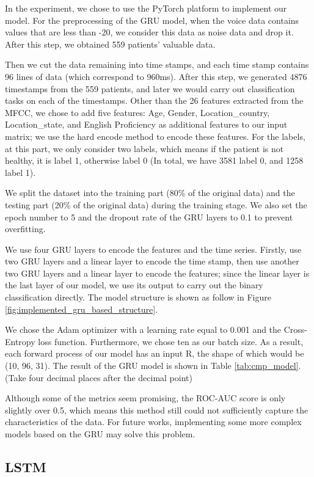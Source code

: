 \documentclass[11pt]{article}
\begin{document}
In the experiment, we chose to use the PyTorch platform to implement our model. For the preprocessing of the GRU model, when the voice data contains values that are less than -20, we consider this data as noise data and drop it. After this step, we obtained 559 patients’ valuable data.

Then we cut the data remaining into time stamps, and each time stamp contains 96 lines of data (which correspond to 960ms). After this step, we generated 4876 timestamps from the 559 patients, and later we would carry out classification tasks on each of the timestamps. Other than the 26 features extracted from the MFCC, we chose to add five features: Age, Gender, Location\_country, Location\_state, and English Proficiency as additional features to our input matrix; we use the hard encode method to encode these features. For the labels, at this part, we only consider two labels, which means if the patient is not healthy, it is label 1, otherwise label 0 (In total, we have 3581 label 0, and 1258 label 1).

We split the dataset into the training part (80\% of the original data) and the testing part (20\% of the original data) during the training stage. We also set the epoch number to 5 and the dropout rate of the GRU layers to 0.1 to prevent overfitting.

We use four GRU layers to encode the features and the time series. Firstly, use two GRU layers and a linear layer to encode the time stamp, then use another two GRU layers and a linear layer to encode the features; since the linear layer is the last layer of our model, we use its output to carry out the binary classification directly. The model structure is shown as follow in Figure \ref{fig:implemented_gru_based_structure}.

We chose the Adam optimizer with a learning rate equal to 0.001 and the Cross-Entropy loss function. Furthermore, we chose ten as our batch size. As a result, each forward process of our model has an input R, the shape of which would be (10, 96, 31). The result of the GRU model is shown in Table \ref{tab:cmp_model}. (Take four decimal places after the decimal point)

Although some of the metrics seem promising, the ROC-AUC score is only slightly over 0.5, which means this method still could not sufficiently capture the characteristics of the data. For future works, implementing some more complex models based on the GRU may solve this problem.

\subsection{LSTM}
\end{document}
